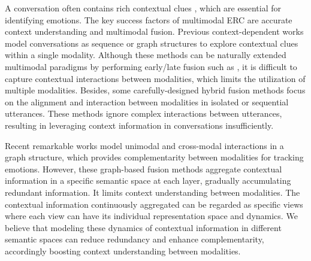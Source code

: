 \documentclass{article}
\begin{document}
A conversation often contains rich contextual clues \cite{DBLP:conf/acl/PoriaHMNCM19,DBLP:conf/acl/HuWH20}, which are essential for identifying emotions.
The key success factors of multimodal ERC are accurate context understanding and multimodal fusion.
Previous context-dependent works \cite{DBLP:conf/aaai/MajumderPHMGC19,DBLP:conf/emnlp/GhosalMPCG19,DBLP:conf/acl/HuWH20} model conversations as sequence or graph structures to explore contextual clues within a single modality. Although these methods can be naturally extended multimodal paradigms by performing early/late fusion such as \cite{DBLP:conf/acl/PoriaCHMZM17, DBLP:conf/emnlp/HazarikaPMCZ18, DBLP:conf/icmcs/FuOWGSLD21}, it is difficult to capture contextual interactions between modalities, which limits the utilization of multiple modalities.
Besides, some carefully-designed hybrid fusion methods \cite{DBLP:conf/emnlp/ZadehCPCM17,DBLP:conf/acl/MorencyLZLSL18,DBLP:conf/aaai/ZadehLMPCM18,DBLP:conf/mm/ChenSOLS21} focus on the alignment and interaction between modalities in isolated or sequential utterances. 
These methods  
ignore complex interactions between utterances, 
resulting in leveraging context information in conversations insufficiently.



Recent remarkable works \cite{DBLP:conf/acl/HuLZJ20,DBLP:conf/icassp/LiuCWLFGD21} model unimodal and cross-modal interactions in a graph structure, which provides complementarity between modalities for tracking emotions. However, these graph-based fusion methods aggregate contextual information in a specific semantic space at each layer, gradually accumulating redundant information. 
It limits context understanding between modalities. 
The contextual information continuously aggregated can be regarded as specific views where each view can have its individual representation space and dynamics.
We believe that modeling these dynamics of contextual information in different semantic spaces can reduce redundancy and enhance complementarity, accordingly boosting context understanding between modalities.
\end{document}
